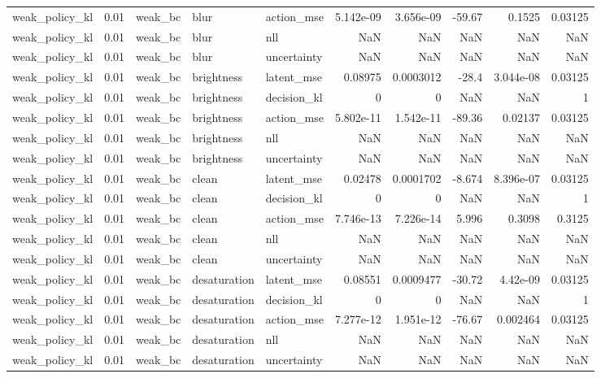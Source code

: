 \begin{tabular}{lrlllrrrrr}
weak\_policy\_kl & 0.01 & weak\_bc & blur & action\_mse & 5.142e-09 & 3.656e-09 & -59.67 & 0.1525 & 0.03125 \\
weak\_policy\_kl & 0.01 & weak\_bc & blur & nll & NaN & NaN & NaN & NaN & NaN \\
weak\_policy\_kl & 0.01 & weak\_bc & blur & uncertainty & NaN & NaN & NaN & NaN & NaN \\
weak\_policy\_kl & 0.01 & weak\_bc & brightness & latent\_mse & 0.08975 & 0.0003012 & -28.4 & 3.044e-08 & 0.03125 \\
weak\_policy\_kl & 0.01 & weak\_bc & brightness & decision\_kl & 0 & 0 & NaN & NaN & 1 \\
weak\_policy\_kl & 0.01 & weak\_bc & brightness & action\_mse & 5.802e-11 & 1.542e-11 & -89.36 & 0.02137 & 0.03125 \\
weak\_policy\_kl & 0.01 & weak\_bc & brightness & nll & NaN & NaN & NaN & NaN & NaN \\
weak\_policy\_kl & 0.01 & weak\_bc & brightness & uncertainty & NaN & NaN & NaN & NaN & NaN \\
weak\_policy\_kl & 0.01 & weak\_bc & clean & latent\_mse & 0.02478 & 0.0001702 & -8.674 & 8.396e-07 & 0.03125 \\
weak\_policy\_kl & 0.01 & weak\_bc & clean & decision\_kl & 0 & 0 & NaN & NaN & 1 \\
weak\_policy\_kl & 0.01 & weak\_bc & clean & action\_mse & 7.746e-13 & 7.226e-14 & 5.996 & 0.3098 & 0.3125 \\
weak\_policy\_kl & 0.01 & weak\_bc & clean & nll & NaN & NaN & NaN & NaN & NaN \\
weak\_policy\_kl & 0.01 & weak\_bc & clean & uncertainty & NaN & NaN & NaN & NaN & NaN \\
weak\_policy\_kl & 0.01 & weak\_bc & desaturation & latent\_mse & 0.08551 & 0.0009477 & -30.72 & 4.42e-09 & 0.03125 \\
weak\_policy\_kl & 0.01 & weak\_bc & desaturation & decision\_kl & 0 & 0 & NaN & NaN & 1 \\
weak\_policy\_kl & 0.01 & weak\_bc & desaturation & action\_mse & 7.277e-12 & 1.951e-12 & -76.67 & 0.002464 & 0.03125 \\
weak\_policy\_kl & 0.01 & weak\_bc & desaturation & nll & NaN & NaN & NaN & NaN & NaN \\
weak\_policy\_kl & 0.01 & weak\_bc & desaturation & uncertainty & NaN & NaN & NaN & NaN & NaN \\
\bottomrule
\end{tabular}
